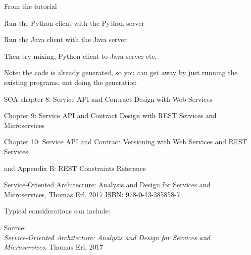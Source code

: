 \documentclass[Screen16to9,17pt]{foils}
\begin{document}

\begin{list2}
\item From the tutorial 
\item Run the Python client with the Python server
\item Run the Java client with the Java server
\item Then try mixing, Python client to Java server etc.
\item Note: the code is already generated, so you can get away by just running the existing programs, not doing the generation
\end{list2}



\begin{list1}
\item SOA chapter 8: Service API and Contract Design
with Web Services
\item Chapter 9: Service API and Contract Design with
REST Services and Microservices
\item Chapter 10: Service API and Contract Versioning
with Web Services and REST Services
\item and Appendix B: REST Constraints Reference
\end{list1}

Service‑Oriented Architecture: Analysis and Design for Services and Microservices, Thomas Erl, 2017
ISBN: 978-0-13-385858-7








\begin{quote}

\end{quote}

Typical considerations can include:
\begin{list2}
\item
\end{list2}
Source: {\footnotesize\\
\emph{Service‑Oriented Architecture: Analysis and Design for Services and Microservices}, Thomas Erl, 2017}

\end{document}
